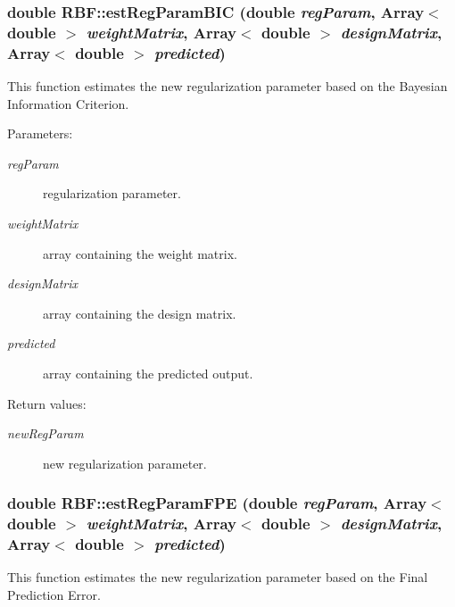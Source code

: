 \subsubsection{\setlength{\rightskip}{0pt plus 5cm}double RBF::est\-Reg\-Param\-BIC (double {\em reg\-Param}, Array$<$ double $>$ {\em weight\-Matrix}, Array$<$ double $>$ {\em design\-Matrix}, Array$<$ double $>$ {\em predicted})\hspace{0.3cm}{\tt  [static]}}\label{classRBF_e15}


This function estimates the new regularization parameter based on the Bayesian Information Criterion. 

\begin{Desc}
\item[Parameters:]
\begin{description}
\item[{\em reg\-Param}]regularization parameter. \item[{\em weight\-Matrix}]array containing the weight matrix. \item[{\em design\-Matrix}]array containing the design matrix. \item[{\em predicted}]array containing the predicted output. \end{description}
\end{Desc}
\begin{Desc}
\item[Return values:]
\begin{description}
\item[{\em new\-Reg\-Param}]new regularization parameter.\end{description}
\end{Desc}
\subsubsection{\setlength{\rightskip}{0pt plus 5cm}double RBF::est\-Reg\-Param\-FPE (double {\em reg\-Param}, Array$<$ double $>$ {\em weight\-Matrix}, Array$<$ double $>$ {\em design\-Matrix}, Array$<$ double $>$ {\em predicted})\hspace{0.3cm}{\tt  [static]}}\label{classRBF_e14}


This function estimates the new regularization parameter based on the Final Prediction Error. 

